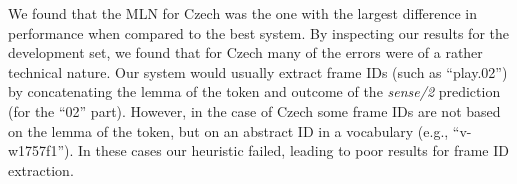 
We found that the MLN for Czech was the one 
with the largest difference in performance when compared to the best 
system. By inspecting our results for the development set, we found that for Czech many of the 
errors were of a rather technical nature. Our system would usually extract frame IDs (such as ``play.02'') by concatenating the lemma of the token and outcome of the \emph{sense/2} prediction (for the ``02'' part). However, in the case of Czech some frame IDs are not based on the lemma of the token, but on an abstract ID in a vocabulary (e.g., ``v-w1757f1''). In these cases our heuristic failed, leading to poor results for frame ID extraction. 





